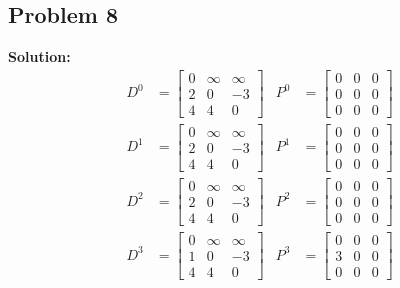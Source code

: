 \documentclass[12pt,a4paper]{article}
\newcommand{\solution}{\noindent\textbf{Solution:}\\\indent}
\begin{document}
\subsection*{Problem 8}
\solution
\begin{align*}
    D^0 &= \begin{bmatrix}
        0 & \infty & \infty \\
        2 & 0 & -3 \\
        4 & 4 & 0
    \end{bmatrix} & P^0 &= \begin{bmatrix}
        0 & 0 & 0 \\
        0 & 0 & 0 \\
        0 & 0 & 0
    \end{bmatrix} \\
    D^1 &= \begin{bmatrix}
        0 & \infty & \infty \\
        2 & 0 & -3 \\
        4 & 4 & 0
    \end{bmatrix} & P^1 &= \begin{bmatrix}
        0 & 0 & 0 \\
        0 & 0 & 0 \\
        0 & 0 & 0
    \end{bmatrix} \\
    D^2 &= \begin{bmatrix}
        0 & \infty & \infty \\
        2 & 0 & -3 \\
        4 & 4 & 0
    \end{bmatrix} & P^2 &= \begin{bmatrix}
        0 & 0 & 0 \\
        0 & 0 & 0 \\
        0 & 0 & 0
    \end{bmatrix} \\
    D^3 &= \begin{bmatrix}
        0 & \infty & \infty \\
        1 & 0 & -3 \\
        4 & 4 & 0
    \end{bmatrix} & P^3 &= \begin{bmatrix}
        0 & 0 & 0 \\
        3 & 0 & 0 \\
        0 & 0 & 0
    \end{bmatrix}
\end{align*}
\end{document}
